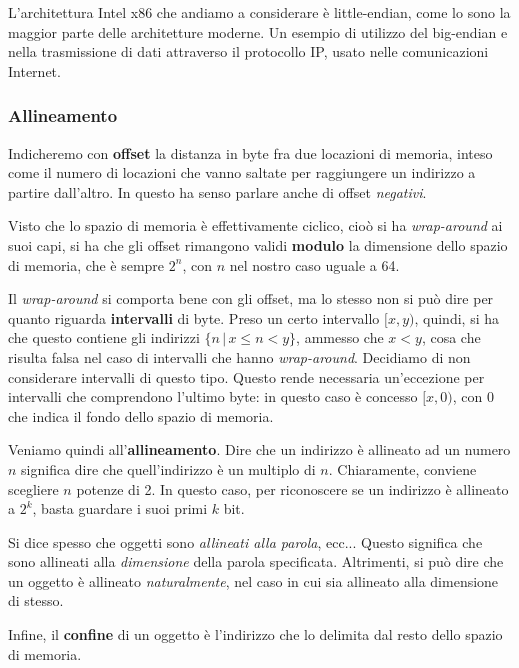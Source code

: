 \documentclass[a4paper,11pt]{article}
\begin{document}
L'architettura Intel x86 che andiamo a considerare è little-endian, come lo sono la maggior parte delle architetture moderne.
Un esempio di utilizzo del big-endian e nella trasmissione di dati attraverso il protocollo IP, usato nelle comunicazioni Internet.

\subsubsection{Allineamento}
Indicheremo con \textbf{offset} la distanza in byte fra due locazioni di memoria, inteso come il numero di locazioni che vanno saltate per raggiungere un indirizzo a partire dall'altro.
In questo ha senso parlare anche di offset \textit{negativi}.

Visto che lo spazio di memoria è effettivamente ciclico, cioò si ha \textit{wrap-around} ai suoi capi, si ha che gli offset rimangono validi \textbf{modulo} la dimensione dello spazio di memoria, che è sempre $2^n$, con $n$ nel nostro caso uguale a 64.

Il \textit{wrap-around} si comporta bene con gli offset, ma lo stesso non si può dire per quanto riguarda \textbf{intervalli} di byte.
Preso un certo intervallo $[x, y)$, quindi, si ha che questo contiene gli indirizzi $\{n \, | \, x \leq n < y\}$, ammesso che $x < y$, cosa che risulta falsa nel caso di intervalli che hanno \textit{wrap-around}. 
Decidiamo di non considerare intervalli di questo tipo.
Questo rende necessaria un'eccezione per intervalli che comprendono l'ultimo byte: in questo caso è concesso $[x, 0)$, con 0 che indica il fondo dello spazio di memoria.

Veniamo quindi all'\textbf{allineamento}.
Dire che un indirizzo è allineato ad un numero $n$ significa dire che quell'indirizzo è un multiplo di $n$.
Chiaramente, conviene scegliere $n$ potenze di 2.
In questo caso, per riconoscere se un indirizzo è allineato a $2^k$, basta guardare i suoi primi $k$ bit.

Si dice spesso che oggetti sono \textit{allineati alla parola}, ecc...
Questo significa che sono allineati alla \textit{dimensione} della parola specificata.
Altrimenti, si può dire che un oggetto è allineato \textit{naturalmente}, nel caso in cui sia allineato alla dimensione di stesso.

Infine, il \textbf{confine} di un oggetto è l'indirizzo che lo delimita dal resto dello spazio di memoria.
\end{document}
